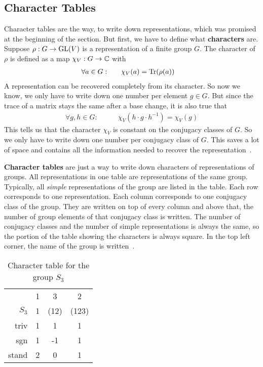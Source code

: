 \subsection{Character Tables}

Character tables are the way, to write down representations, which was promised at the beginning of the section.
But first, we have to define what \textbf{characters} are.
Suppose $\rho: G \to \operatorname{GL}(V)$ is a representation of a finite group $G$.
The character of $\rho$ is defined as a map $\chi_V: G \to \mathbb{C}$ with
\begin{align}
    \forall a \in G: \qquad & \chi_V(a) = \operatorname{Tr}(\rho(a))
\end{align}
A representation can be recovered completely from its character.
So now we know, we only have to write down one number per element $g \in G$.
But since the trace of a matrix stays the same after a base change, it is also true that
\begin{align}
    \forall g, h \in G: \qquad & \chi_V(h \cdot g \cdot h^{-1}) = \chi_V(g)
\end{align}
This tells us that the character $\chi_V$ is constant on the conjugacy classes of $G$.
So we only have to write down one number per conjugacy class of $G$.
This saves a lot of space and contains all the information needed to recover the representation~\cite{fulton2013}.

\textbf{Character tables} are just a way to write down characters of representations of groups.
All representations in one table are representations of the same group.
Typically, all \textit{simple} representations of the group are listed in the table.
Each row corresponds to one representation.
Each column corresponds to one conjugacy class of the group.
They are written on top of every column and above that, the number of group elements of that conjugacy class is written.
The number of conjugacy classes and the number of simple representations is always the same, so the portion of the table showing the characters is always square.
In the top left corner, the name of the group is written~\cite{fulton2013}.

\begin{table}
    \centering

    \begin{tabular}{r | c  c  c}
                & 1 & 3     & 2     \\
        $S_3$   & 1 & (12)  & (123) \\ \hline
        triv    & 1 & 1     & 1     \\
        sgn     & 1 & -1    & 1     \\
        stand   & 2 & 0     & 1
    \end{tabular}

    \caption{Character table for the group $S_3$}
    \label{tab:reprep.char.table}
\end{table}

